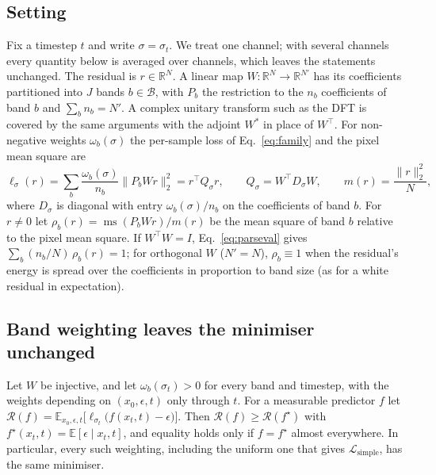 
\subsection{Setting}
\label{app:theory-setting}

Fix a timestep $t$ and write $\sigma = \sigma_t$. We treat one channel; with
several channels every quantity below is averaged over channels, which leaves
the statements unchanged. The residual is $r \in \mathbb{R}^N$. A linear map
$W : \mathbb{R}^N \to \mathbb{R}^{N'}$ has its coefficients partitioned into $J$
bands $b \in \mathcal{B}$, with $P_b$ the restriction to the $n_b$ coefficients
of band $b$ and $\sum_b n_b = N'$. A complex unitary transform such as the DFT
is covered by the same arguments with the adjoint $W^{*}$ in place of
$W^\top$. For non-negative weights $\omega_b(\sigma)$
the per-sample loss of Eq.~\eqref{eq:family} and the pixel mean square are
\begin{equation}
  \ell_\sigma(r) = \sum_{b} \frac{\omega_b(\sigma)}{n_b} \lVert P_b W r \rVert_2^2
                 = r^\top Q_\sigma r,
  \qquad
  Q_\sigma = W^\top D_\sigma W,
  \qquad
  m(r) = \frac{\lVert r \rVert_2^2}{N},
  \label{eq:app-loss}
\end{equation}
where $D_\sigma$ is diagonal with entry $\omega_b(\sigma)/n_b$ on the
coefficients of band $b$. For $r \neq 0$ let
$\rho_b(r) = \operatorname{ms}(P_b W r)/m(r)$ be the mean square of band $b$
relative to the pixel mean square. If $W^\top W = I$, Eq.~\eqref{eq:parseval}
gives $\sum_b (n_b/N)\,\rho_b(r) = 1$; for orthogonal $W$ ($N' = N$),
$\rho_b \equiv 1$ when the residual's
energy is spread over the coefficients in proportion to band size (as for a
white residual in expectation).

\subsection{Band weighting leaves the minimiser unchanged}
\label{app:minimiser}

\begin{proposition}
\label{prop:minimiser}
Let $W$ be injective, and let $\omega_b(\sigma_t) > 0$ for every band and
timestep, with the weights depending on $(x_0, \epsilon, t)$ only through $t$.
For a measurable predictor $f$ let
$\mathcal{R}(f) = \mathbb{E}_{x_0,\epsilon,t}\big[\ell_{\sigma_t}\big(f(x_t,t) - \epsilon\big)\big]$.
Then $\mathcal{R}(f) \ge \mathcal{R}(f^\star)$ with
$f^\star(x_t, t) = \mathbb{E}[\epsilon \mid x_t, t]$, and equality holds only
if $f = f^\star$ almost everywhere. In particular, every such weighting,
including the uniform one that gives $\mathcal{L}_{\mathrm{simple}}$, has the
same minimiser.
\end{proposition}

